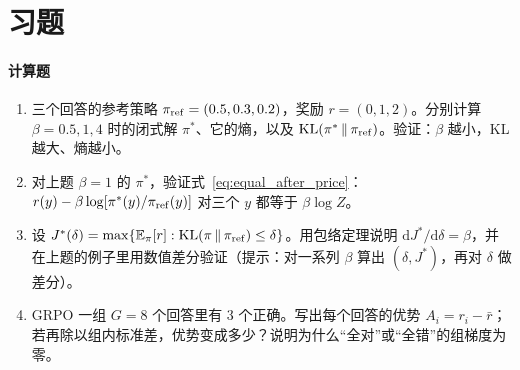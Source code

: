 \section{习题}

\paragraph{计算题}
\begin{enumerate}
    \item 三个回答的参考策略 $\pi_{\rm ref} = (0.5, 0.3, 0.2)$，奖励 $r = (0, 1, 2)$。分别计算 $\beta = 0.5, 1, 4$ 时的闭式解 $\pi^*$、它的熵，以及 $\mathrm{KL}(\pi^*\,\|\,\pi_{\rm ref})$。验证：$\beta$ 越小，KL 越大、熵越小。

    \item 对上题 $\beta = 1$ 的 $\pi^*$，验证式~\eqref{eq:equal_after_price}：$r(y) - \beta\log[\pi^*(y)/\pi_{\rm ref}(y)]$ 对三个 $y$ 都等于 $\beta\log Z$。

    \item 设 $J^*(\delta) = \max\{\mathbb{E}_\pi[r] : \mathrm{KL}(\pi\,\|\,\pi_{\rm ref}) \le \delta\}$。用包络定理说明 $\mathrm{d}J^*/\mathrm{d}\delta = \beta$，并在上题的例子里用数值差分验证（提示：对一系列 $\beta$ 算出 $(\delta, J^*)$，再对 $\delta$ 做差分）。

    \item GRPO 一组 $G = 8$ 个回答里有 3 个正确。写出每个回答的优势 $A_i = r_i - \bar r$；若再除以组内标准差，优势变成多少？说明为什么“全对”或“全错”的组梯度为零。
\end{enumerate}

